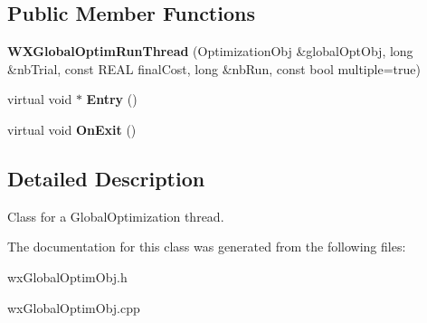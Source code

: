 \subsection*{Public Member Functions}
\begin{DoxyCompactItemize}
\item 
\mbox{\label{class_obj_cryst_1_1_w_x_global_optim_run_thread_ad4a30391ecd09902d2bde258cf6d7c05}} 
{\bfseries W\+X\+Global\+Optim\+Run\+Thread} (Optimization\+Obj \&global\+Opt\+Obj, long \&nb\+Trial, const R\+E\+AL final\+Cost, long \&nb\+Run, const bool multiple=true)
\item 
\mbox{\label{class_obj_cryst_1_1_w_x_global_optim_run_thread_afe8f36fa42780038e50cf91ce948aa1c}} 
virtual void $\ast$ {\bfseries Entry} ()
\item 
\mbox{\label{class_obj_cryst_1_1_w_x_global_optim_run_thread_abf49269310ff086de4178543257f55a1}} 
virtual void {\bfseries On\+Exit} ()
\end{DoxyCompactItemize}


\subsection{Detailed Description}
Class for a Global\+Optimization thread. 

The documentation for this class was generated from the following files\+:\begin{DoxyCompactItemize}
\item 
wx\+Global\+Optim\+Obj.\+h\item 
wx\+Global\+Optim\+Obj.\+cpp\end{DoxyCompactItemize}
